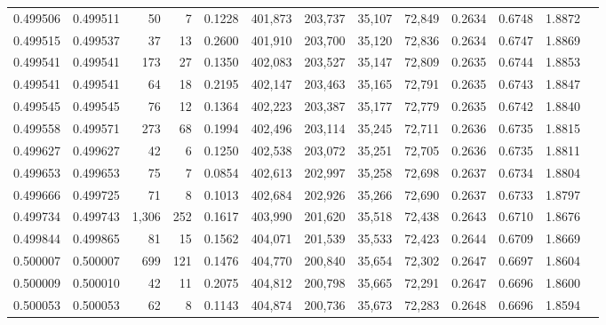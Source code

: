 \begin{tabular}{rrrrrrrrrrrrr}
0.499506 & 0.499511 &    50 &     7 &                                     0.1228 & 401,873 & 203,737 &  35,107 &  72,849 & 0.2634 & 0.6748 & 1.8872 \\
0.499515 & 0.499537 &    37 &    13 &                                     0.2600 & 401,910 & 203,700 &  35,120 &  72,836 & 0.2634 & 0.6747 & 1.8869 \\
0.499541 & 0.499541 &   173 &    27 &                                     0.1350 & 402,083 & 203,527 &  35,147 &  72,809 & 0.2635 & 0.6744 & 1.8853 \\
0.499541 & 0.499541 &    64 &    18 &                                     0.2195 & 402,147 & 203,463 &  35,165 &  72,791 & 0.2635 & 0.6743 & 1.8847 \\
0.499545 & 0.499545 &    76 &    12 &                                     0.1364 & 402,223 & 203,387 &  35,177 &  72,779 & 0.2635 & 0.6742 & 1.8840 \\
0.499558 & 0.499571 &   273 &    68 &                                     0.1994 & 402,496 & 203,114 &  35,245 &  72,711 & 0.2636 & 0.6735 & 1.8815 \\
0.499627 & 0.499627 &    42 &     6 &                                     0.1250 & 402,538 & 203,072 &  35,251 &  72,705 & 0.2636 & 0.6735 & 1.8811 \\
0.499653 & 0.499653 &    75 &     7 &                                     0.0854 & 402,613 & 202,997 &  35,258 &  72,698 & 0.2637 & 0.6734 & 1.8804 \\
0.499666 & 0.499725 &    71 &     8 &                                     0.1013 & 402,684 & 202,926 &  35,266 &  72,690 & 0.2637 & 0.6733 & 1.8797 \\
0.499734 & 0.499743 & 1,306 &   252 &                                     0.1617 & 403,990 & 201,620 &  35,518 &  72,438 & 0.2643 & 0.6710 & 1.8676 \\
0.499844 & 0.499865 &    81 &    15 &                                     0.1562 & 404,071 & 201,539 &  35,533 &  72,423 & 0.2644 & 0.6709 & 1.8669 \\
0.500007 & 0.500007 &   699 &   121 &                                     0.1476 & 404,770 & 200,840 &  35,654 &  72,302 & 0.2647 & 0.6697 & 1.8604 \\
0.500009 & 0.500010 &    42 &    11 &                                     0.2075 & 404,812 & 200,798 &  35,665 &  72,291 & 0.2647 & 0.6696 & 1.8600 \\
0.500053 & 0.500053 &    62 &     8 &                                     0.1143 & 404,874 & 200,736 &  35,673 &  72,283 & 0.2648 & 0.6696 & 1.8594 \\

\end{tabular}
